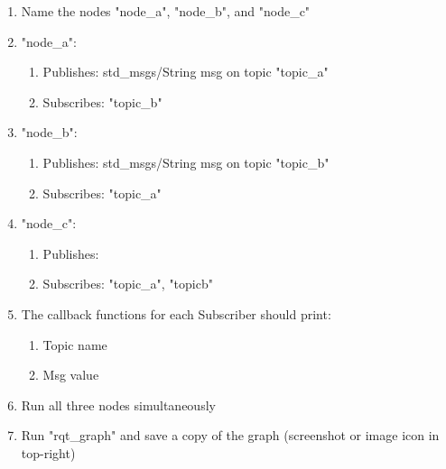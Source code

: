 \documentclass[12pt]{article}
\begin{document}
\begin{enumerate}
\item Name the nodes "node\_a", "node\_b", and "node\_c"

\item "node\_a":
\begin{enumerate}
\item Publishes: std\_msgs/String msg on topic "topic\_a"
\item Subscribes: "topic\_b"
\end{enumerate}

\item "node\_b":
\begin{enumerate}
\item Publishes: std\_msgs/String msg on topic "topic\_b"
\item Subscribes: "topic\_a"
\end{enumerate}

\item "node\_c":
\begin{enumerate}
\item Publishes: 
\item Subscribes: "topic\_a", "topicb"
\end{enumerate}


\item The callback functions for each Subscriber should print:
\begin{enumerate}
\item Topic name
\item Msg value
\end{enumerate}


\item Run all three nodes simultaneously 

\item Run "rqt\_graph" and save a copy of the graph (screenshot or image icon in top-right)


\end{enumerate}
 
 
 
 
\end{document}
